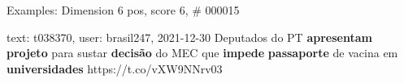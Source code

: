 \begin{frame}{Examples: Dimension 6 pos, score 6, \# 000015}
\footnotesize
\begin{exampleblock}{text: t038370, user: brasil247, 2021-12-30}
Deputados do PT \textbf{apresentam} \textbf{projeto} para sustar 
\textbf{decisão} do MEC que \textbf{impede} \textbf{passaporte} de vacina em 
\textbf{universidades} https://t.co/vXW9NNrv03 
\end{exampleblock}
\end{frame}
